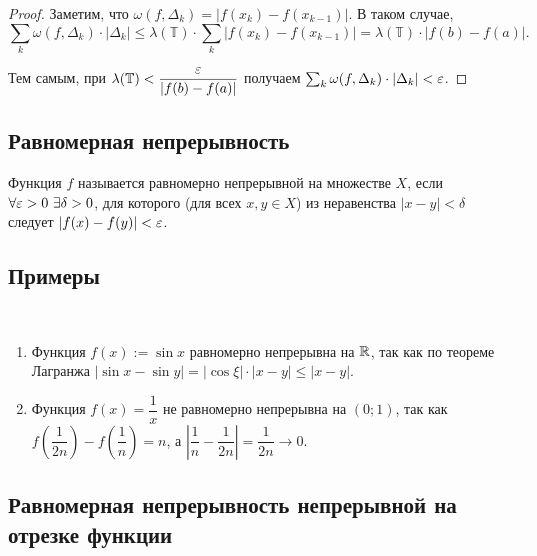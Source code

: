 \documentclass[a4paper]{article}
\theoremstyle{named}
\newcommand{\T}{\mathbb{T}}
\begin{document}
        \begin{proof}
            Заметим, что $\omega(f, \Delta_k) = |f(x_k) - f(x_{k - 1})|$. В таком случае,
            \begin{equation*}
                \sum_k \omega(f, \Delta_k) \cdot |\Delta_k| \leq \lambda(\T) \cdot \sum_k |f(x_k) - f(x_{k - 1})| = \lambda(\T) \cdot |f(b) - f(a)|.
            \end{equation*}

            Тем самым, при $\lambda(\T) < \dfrac{\eps}{|f(b) - f(a)|}$ получаем $\sum_k \omega(f, \Delta_k) \cdot |\Delta_k| < \varepsilon$.
        \end{proof}

        \subsection{Равномерная непрерывность}

        \begin{definition*}
            Функция $f$ называется равномерно непрерывной на множестве $X$, если $\forall \varepsilon > 0 \ \exists \delta  > 0$, для которого (для всех $x, y \in X$) из неравенства $|x - y| < \delta$ следует $|f(x) - f(y)| < \varepsilon$.
        \end{definition*}

        \subsection{Примеры}

        \begin{example*}~
            
            \begin{enumerate}
            \item
                Функция $f(x) := \sin x$ равномерно непрерывна на $\mathbb{R}$, так как по теореме Лагранжа $|\sin x - \sin y| = |\cos \xi| \cdot |x - y| \leq |x - y|$.

            \item
                Функция $f(x) = \dfrac{1}{x}$ не равномерно непрерывна на $(0; 1)$, так как $f \left(\dfrac{1}{2n}\right) - f \left(\dfrac{1}{n}\right) = n$, а $\left|\dfrac{1}{n} - \dfrac{1}{2n}\right| = \dfrac{1}{2n} \to 0$.
            \end{enumerate}
        \end{example*}

        \subsection{Равномерная непрерывность непрерывной на отрезке функции}
\end{document}

